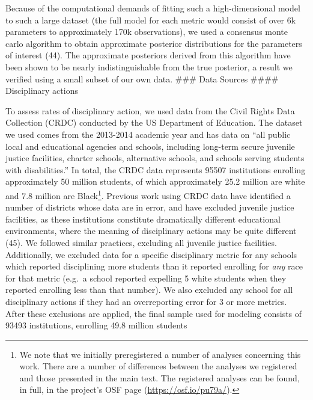 \documentclass[9pt,twocolumn,twoside,lineno]{pnas-new}
\begin{document}
Because of the computational demands of fitting such a high-dimensional
model to such a large dataset (the full model for each metric would
consist of over 6k parameters to approximately 170k observations), we
used a consensus monte carlo algorithm to obtain approximate posterior
distributions for the parameters of interest (44). The approximate
posteriors derived from this algorithm have been shown to be nearly
indistinguishable from the true posterior, a result we verified using a
small subset of our own data. \#\#\# Data Sources \#\#\#\# Disciplinary
actions

To assess rates of disciplinary action, we used data from the Civil
Rights Data Collection (CRDC) conducted by the US Department of
Education. The dataset we used comes from the 2013-2014 academic year
and has data on ``all public local and educational agencies and schools,
including long-term secure juvenile justice facilities, charter schools,
alternative schools, and schools serving students with disabilities.''
In total, the CRDC data represents 95507 institutions enrolling
approximately 50 million students, of which approximately 25.2 million
are white and 7.8 million are Black\footnote{We note that we initially
  preregistered a number of analyses concerning this work. There are a
  number of differences between the analyses we registered and those
  presented in the main text. The registered analyses can be found, in
  full, in the project's OSF page (\url{https://osf.io/pu79a/}).}.
Previous work using CRDC data have identified a number of districts
whose data are in error, and have excluded juvenile justice facilities,
as these institutions constitute dramatically different educational
environments, where the meaning of disciplinary actions may be quite
different (45). We followed similar practices, excluding all juvenile
justice facilities. Additionally, we excluded data for a specific
disciplinary metric for any schools which reported disciplining more
students than it reported enrolling for \emph{any} race for that metric
(e.g.~a school reported expelling 5 white students when they reported
enrolling less than that number). We also excluded any school for all
disciplinary actions if they had an overreporting error for 3 or more
metrics. After these exclusions are applied, the final sample used for
modeling consists of 93493 institutions, enrolling 49.8 million students
\end{document}
